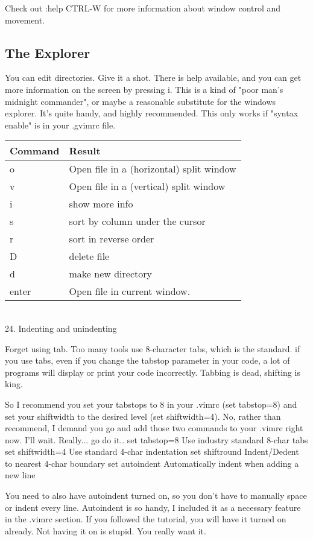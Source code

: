 \documentclass[a4paper, 12pt]{article}
\begin{document}
Check out :help CTRL-W for more information about window control and movement.
\subsection{The Explorer}
\label{The Explorer}

You can edit directories. Give it a shot. There is help available, and you can get more information on the screen by pressing i. This is a kind of "poor man's midnight commander", or maybe a reasonable substitute for the windows explorer. It's quite handy, and highly recommended. This only works if "syntax enable" is in your .gvimrc file.

\begin{tabular}{ l | p{8cm} }
  \textbf{Command} & \textbf{Result}\\ \hline
      o	     & Open file in a (horizontal) split window\\
      v	     & Open file in a (vertical) split window \\
      i	     & show more info \\
      s	     & sort by column under the cursor\\
      r	     & sort in reverse order\\
      D	     & delete file\\
      d	     & make new directory\\
      enter	 & Open file in current window.\\
\end{tabular}\\
      	
  24. Indenting and unindenting

      Forget using tab. Too many tools use 8-character tabs, which is the standard. if you use tabs, even if you change the tabstop parameter in your code, a lot of programs will display or print your code incorrectly. Tabbing is dead, shifting is king.

      So I recommend you set your tabstops to 8 in your .vimrc (set tabstop=8) and set your shiftwidth to the desired level (set shiftwidth=4). No, rather than recommend, I demand you go and add those two commands to your .vimrc right now. I'll wait. Really... go do it..
      set tabstop=8	Use industry standard 8-char tabs
      set shiftwidth=4	Use standard 4-char indentation
      set shiftround	Indent/Dedent to nearest 4-char boundary
      	set autoindent	Automatically indent when adding a new line

      You need to also have autoindent turned on, so you don't have to manually space or indent every line. Autoindent is so handy, I included it as a necessary feature in the .vimrc section. If you followed the tutorial, you will have it turned on already. Not having it on is stupid. You really want it.
\end{document}
